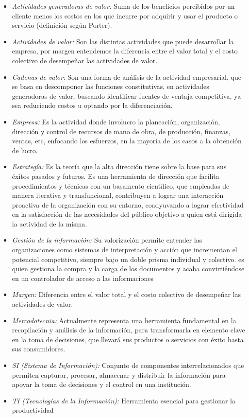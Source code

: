 \begin{itemize}
	\item \emph{Actividades generadoras de valor:} Suma de los beneficios percibidos
		 por un cliente menos los costos en los que incurre por adquirir y usar el
		 producto o servicio (definición según Porter).
	\item \emph{Actividades de valor:}  Son las distintas actividades que puede desarrollar
		 la empresa, por margen entendemos la diferencia entre el valor total y el costo
		 colectivo de desempeñar las actividades de valor.
	\item \emph{Cadenas de valor:} Son una forma de análisis de la actividad empresarial, que
		 se basa en descomponer las funciones constitutivas, en actividades generadoras
		 de valor, buscando identificar fuentes de ventaja competitiva, ya sea reduciendo
		 costos u optando por la diferenciación.
	\item \emph{Empresa:} Es la actividad donde involucro la planeación, organización, dirección
		 y control de recursos de mano de obra, de producción, finanzas, ventas, etc, enfocando
		 los esfuerzos, en la mayoría de los casos a la obtención de lucro.
	\item \emph{Estrategía:} Es la teoría que la alta dirección tiene sobre la base para sus éxitos
		 pasados y futuros. Es una herramienta de dirección que facilita procedimientos y
		 técnicas con un basamento científico, que empleadas de manera iterativa y transfuncional,
		 contribuyen a lograr una interacción proactiva de la organización con su entorno,
		 coadyuvando a lograr efectividad en la satisfacción de las necesidades del público
		 objetivo a quien está dirigida la actividad de la misma.
	\item \emph{Gestión de la información:} Su valorización permite entender las organizaciones como
		 sistemas de interpretación y acción que incrementan el potencial competitivo, siempre
		 bajo un doble prisma individual y colectivo. es quien gestiona la compra y la carga de
		 los documentos y acaba convirtiéndose en un controlador de acceso a las informaciones
	\item \emph{Margen:} Diferencia entre el valor total y el costo colectivo de desempeñar las
		 actividades de valor.
	\item \emph{Mercadotecnia:} Actualmente representa una herramienta fundamental en la recopilación
		 y análisis de la información, para transformarla en elemento clave en la toma de decisiones,
		 que llevará sus productos o servicios con éxito hasta sus consumidores.
	\item \emph{SI (Sistema de Información):} Conjunto de componentes interrelacionados que permiten
		 capturar, procesar, almacenar y distribuir la información para apoyar la toma de decisiones
		 y el control en una institución.
	\item \emph{TI (Tecnologías de la Información):} Herramienta esencial para gestionar la productividad


\end{itemize}
